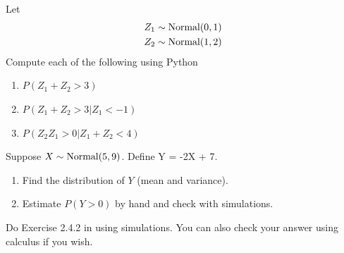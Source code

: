 




\begin{exercise} Let
\begin{align*}
Z_1 &\sim {\rm Normal}(0,1)\\
Z_2 &\sim {\rm Normal}(1,2)
\end{align*} 
Compute each of the following using Python
\begin{enumerate}[label=(\alph*)]
\item $P(Z_1 + Z_2>3)$
\item $P(Z_1 + Z_2>3|Z_1<-1)$
\item $P(Z_2Z_1>0|Z_1+Z_2<4)$
\end{enumerate}
\end{exercise}

\begin{exercise}
Suppose $X \sim {\rm Normal}(5,9)$. Define
Y = -2X + 7.
\begin{enumerate}[label=(\alph*)]
\item Find the distribution of $Y$ (mean and variance).
\item Estimate $P(Y > 0)$ by hand and check with simulations. 
\end{enumerate}
\end{exercise}




\begin{exercise}
Do Exercise  2.4.2 in  \cite{evans} using simulations. You can also check your answer using calculus if you wish. 
\end{exercise}

